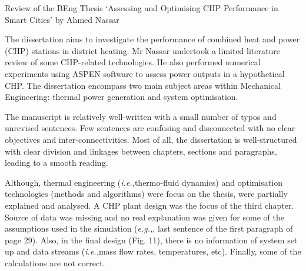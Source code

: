 \documentclass[14pt,twoside]{report}
\newcommand{\ie}{{\it i.e.,}}
\newcommand{\eg}{{\it e.g.,}}
\begin{document}
\vfill
\clearpage


\bigskip

\begin{center}
  {\Large Review of the BEng Thesis `Assessing and Optimising CHP Performance in Smart Cities' by Ahmed Nassar}
\end{center}
The dissertation aims to investigate the performance of combined heat and power (CHP) stations in district heating. Mr Nassar undertook a limited literature review of some CHP-related technologies. He also performed numerical experiments using ASPEN software to assess power outputs in a hypothetical CHP. The dissertation encompass two main subject areas within Mechanical Engineering: thermal power generation and system optimisation.

The manuscript is relatively well-written with a small number of typos and unrevised sentences. Few sentences are confusing and disconnected with no clear objectives and inter-connectivities. Most of all, the dissertation is well-structured with clear division and linkages between chapters, sections and paragraphs, leading to a smooth reading.

Although, thermal engineering (\ie thermo-fluid dynamics) and optimisation technologies (methods and algorithms) were focus on the thesis, were partially explained and analysed. A CHP plant design was the focus of the third chapter. Source of data was missing and no real explanation was given for some of the assumptions used in the simulation (\eg, last sentence of the first paragraph of page 29). Also, in the final design (Fig. 11), there is no information of system set up and data streams (\ie mass flow rates, temperatures, etc). Finally, some of the calculations are not correct.
\end{document}
